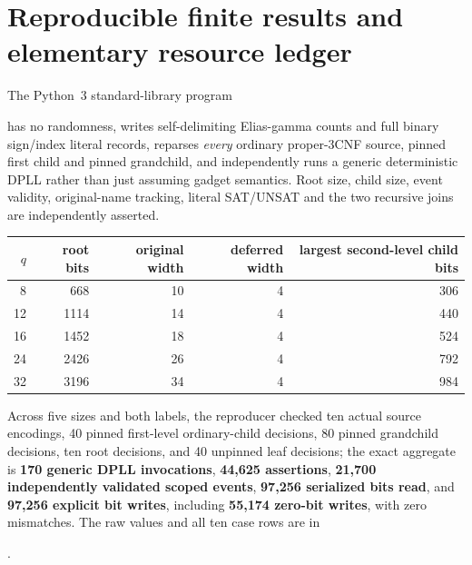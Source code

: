 \documentclass[11pt]{article}
\begin{document}
\section{Reproducible finite results and elementary resource ledger}
The Python~3 standard-library program
\begin{center}\small
{}
\end{center}
has no randomness, writes self-delimiting Elias-gamma counts and
full binary sign/index literal records, reparses \emph{every}
ordinary proper-3CNF source, pinned first child and pinned
grandchild, and independently runs a generic deterministic DPLL
rather than just assuming gadget semantics. Root size, child size,
event validity, original-name tracking, literal SAT/UNSAT and the
two recursive joins are independently asserted.

\begin{center}
\begin{tabular}{rrrrr}
\toprule
$q$ & root bits & original width & deferred width &
largest second-level child bits\\
\midrule
8&668&10&4&306\\
12&1114&14&4&440\\
16&1452&18&4&524\\
24&2426&26&4&792\\
32&3196&34&4&984\\
\bottomrule
\end{tabular}
\end{center}

Across five sizes and both labels, the reproducer checked ten
actual source encodings, 40 pinned first-level ordinary-child
decisions, 80 pinned grandchild decisions, ten root decisions,
and 40 unpinned leaf decisions; the exact aggregate is
\textbf{170 generic DPLL invocations},
\textbf{44,625 assertions}, \textbf{21,700 independently
validated scoped events}, \textbf{97,256 serialized bits read},
and \textbf{97,256 explicit bit writes}, including \textbf{55,174
zero-bit writes}, with zero mismatches.
The raw values and all ten case rows are in
\begin{center}\small
{}.
\end{center}
\end{document}
